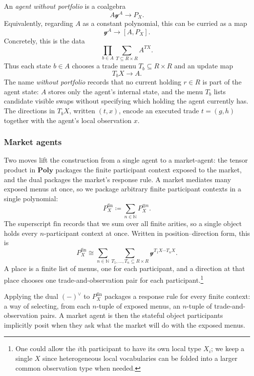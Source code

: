 \documentclass[11pt, one side, article]{memoir}
\theoremstyle{definition}
\theoremstyle{plain}
\newenvironment{definition}
  {\pushQED{\qed}\renewcommand{\qedsymbol}{$\lozenge$}\definitionx}
  {\popQED\enddefinitionx}
\newcommand{\Cat}[1]{\mathbf{#1}}%
\newcommand{\nn}{\mathbb{N}}
\newcommand{\yon}{{\mathcal{y}}}
\newcommand{\poly}{\Cat{Poly}}
\newcommand{\0}{\textsf{0}}
\newcommand{\1}{\tn{\textsf{1}}}
\begin{document}
\begin{definition}[Agent without portfolio]\label{def:agent-without-portfolio}
An \emph{agent without portfolio} is a coalgebra
\[
A\yon^A\to P_X.
\]
Equivalently, regarding $A$ as a constant polynomial, this can be curried as a map
\[
\yon^A\to [A,P_X].
\]
Concretely, this is the data
\[
\prod_{b\in A}\sum_{T\subseteq R\times R}A^{T X}.
\]
Thus each state $b\in A$ chooses a trade menu $T_b\subseteq R\times R$ and an update map
\[
T_b X\to A.
\]
The name \emph{without portfolio} records that no current holding $r \in R$ is part of the agent state: $A$ stores only the agent's internal state, and the menu $T_b$ lists candidate visible swaps without specifying which holding the agent currently has.  The directions in $T_b X$, written $(t,x)$, encode an executed trade $t=(g,h)$ together with the agent's local observation $x$.
\end{definition}

\subsubsection*{Market agents}

Two moves lift the construction from a single agent to a market-agent: the tensor product in $\poly$ packages the finite participant context exposed to the market, and the dual packages the market's response rule.  A market mediates many exposed menus at once, so we package arbitrary finite participant contexts in a single polynomial:
\[
P_X^{\mathrm{fin}}\coloneqq\sum_{n\in\nn}P_X^{\otimes n}.
\]
The superscript $\mathrm{fin}$ records that we sum over all finite arities, so a single object holds every $n$-participant context at once.  Written in position--direction form, this is
\[
P_X^{\mathrm{fin}}
\cong
\sum_{n\in\nn}
\sum_{T_1,\ldots,T_n\subseteq R\times R}
\yon^{T_1X\cdots T_nX}.
\]
A place is a finite list of menus, one for each participant, and a direction at that place chooses one trade-and-observation pair for each participant.\footnote{One could allow the $i$th participant to have its own local type $X_i$; we keep a single $X$ since heterogeneous local vocabularies can be folded into a larger common observation type when needed.}

Applying the dual $(-)^\vee$ to $P_X^{\mathrm{fin}}$ packages a response rule for every finite context: a way of selecting, from each $n$-tuple of exposed menus, an $n$-tuple of trade-and-observation pairs.  A market agent is then the stateful object participants implicitly posit when they ask what the market will do with the exposed menus.
\end{document}
